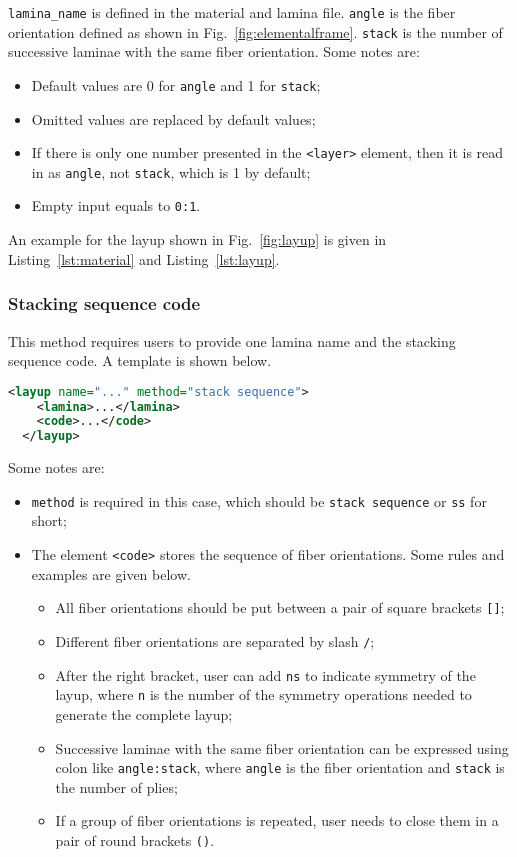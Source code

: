 \documentclass{book}
\begin{document}
\lstinline{lamina_name} is defined in the material and lamina file. 
\lstinline{angle} is the fiber orientation defined as shown in 
Fig.~\ref{fig:elementalframe}. \lstinline{stack} is the number of 
successive laminae with the same fiber orientation. Some notes are:
\begin{itemize}
  \item Default values are 0 for \lstinline{angle} and 1 for \lstinline{stack};
  \item Omitted values are replaced by default values;
  \item If there is only one number presented in the \lstinline{<layer>} 
    element, then it is read in as \lstinline{angle}, not \lstinline{stack}, 
    which is 1 by default;
  \item Empty input equals to \lstinline{0:1}.
\end{itemize}

An example for the layup shown in Fig.~\ref{fig:layup} is given in 
Listing~\ref{lst:material} and Listing~\ref{lst:layup}.

\subsubsection{Stacking sequence code}

This method requires users to provide one lamina name and the stacking 
sequence code. A template is shown below.

\begin{lstlisting}[language=xml]
  <layup name="..." method="stack sequence">
    <lamina>...</lamina>
    <code>...</code>
  </layup>
\end{lstlisting}

Some notes are:
\begin{itemize}
  \item \lstinline{method} is required in this case, which should be 
    \lstinline{stack sequence} or \lstinline{ss} for short;
  \item The element \lstinline{<code>} stores the sequence of fiber 
    orientations. Some rules and examples are given below.
  \begin{itemize}
    \item All fiber orientations should be put between a pair of square 
      brackets \lstinline{[]};
    \item Different fiber orientations are separated by slash \lstinline{/};
    \item After the right bracket, user can add \lstinline{ns} to indicate 
      symmetry of the layup, where \lstinline{n} is the number of the 
      symmetry operations needed to generate the complete layup;
    \item Successive laminae with the same fiber orientation can be 
      expressed using colon like \lstinline{angle:stack}, where 
      \lstinline{angle} is the fiber orientation and \lstinline{stack} 
      is the number of plies;
    \item If a group of fiber orientations is repeated, user needs to 
      close them in a pair of round brackets \lstinline{()}.
  \end{itemize}
\end{itemize}
\end{document}
